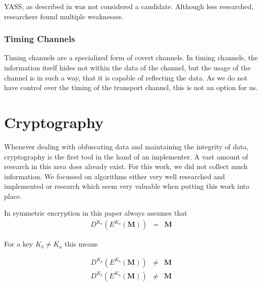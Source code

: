 
YASS, as described in \cite{solanki2007yass} was not considered a candidate. Although less researched, researchers found multiple weaknesses\cite{kodovsky2010modern,li2009steganalysis}. 

\subsubsection{Timing Channels}

Timing channels are a specialized form of covert channels. In timing channels, the information itself hides not within the data of the channel, but the usage of the channel is in such a way, that it is capable of reflecting the data. As we do not have control over the timing of the transport channel, this is not an option for us.

\section{Cryptography}

Whenever dealing with obfuscating data and maintaining the integrity of data, cryptography is the first tool in the hand of an implementer. A vast amount of research in this area does already exist. For this work, we did not collect much information. We focussed on algorithms either very well researched and implemented or research which seem very valuable when putting this work into place. 

In symmetric encryption in this paper always assumes that
\begin{eqnarray}
	D^{K_a}\left(E^{K_a}\left(\mathbf{M}\right)\right) & = & \mathbf{M}
\end{eqnarray} 

For a key $K_b\neq K_a$ this means

\begin{eqnarray}
	D^{K_a}\left(E^{K_b}\left(\mathbf{M}\right)\right) & \neq & \mathbf{M}\\
	D^{K_b}\left(E^{K_a}\left(\mathbf{M}\right)\right) & \neq & \mathbf{M}
\end{eqnarray} 

